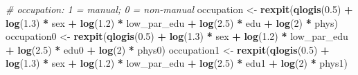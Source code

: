 \documentclass[
]{book}
\newenvironment{Shaded}{\begin{snugshade}}{\end{snugshade}}
\newcommand{\CommentTok}[1]{\textcolor[rgb]{0.56,0.35,0.01}{\textit{#1}}}
\newcommand{\DecValTok}[1]{\textcolor[rgb]{0.00,0.00,0.81}{#1}}
\newcommand{\FloatTok}[1]{\textcolor[rgb]{0.00,0.00,0.81}{#1}}
\newcommand{\FunctionTok}[1]{\textcolor[rgb]{0.13,0.29,0.53}{\textbf{#1}}}
\newcommand{\NormalTok}[1]{#1}
\newcommand{\OtherTok}[1]{\textcolor[rgb]{0.56,0.35,0.01}{#1}}
\newcommand{\SpecialCharTok}[1]{\textcolor[rgb]{0.81,0.36,0.00}{\textbf{#1}}}
\begin{document}
\begin{Shaded}
\begin{Highlighting}[]
  \CommentTok{\# occupation: 1 = manual; 0 = non{-}manual}
\NormalTok{  occupation }\OtherTok{\textless{}{-}} \FunctionTok{rexpit}\NormalTok{(}\FunctionTok{qlogis}\NormalTok{(}\FloatTok{0.5}\NormalTok{) }\SpecialCharTok{+} \FunctionTok{log}\NormalTok{(}\FloatTok{1.3}\NormalTok{) }\SpecialCharTok{*}\NormalTok{ sex  }\SpecialCharTok{+} \FunctionTok{log}\NormalTok{(}\FloatTok{1.2}\NormalTok{) }\SpecialCharTok{*}\NormalTok{ low\_par\_edu }\SpecialCharTok{+} 
                   \FunctionTok{log}\NormalTok{(}\FloatTok{2.5}\NormalTok{) }\SpecialCharTok{*}\NormalTok{ edu }\SpecialCharTok{+} \FunctionTok{log}\NormalTok{(}\DecValTok{2}\NormalTok{) }\SpecialCharTok{*}\NormalTok{ phys) }
\NormalTok{  occupation0 }\OtherTok{\textless{}{-}} \FunctionTok{rexpit}\NormalTok{(}\FunctionTok{qlogis}\NormalTok{(}\FloatTok{0.5}\NormalTok{) }\SpecialCharTok{+} \FunctionTok{log}\NormalTok{(}\FloatTok{1.3}\NormalTok{) }\SpecialCharTok{*}\NormalTok{ sex  }\SpecialCharTok{+} \FunctionTok{log}\NormalTok{(}\FloatTok{1.2}\NormalTok{) }\SpecialCharTok{*}\NormalTok{ low\_par\_edu }\SpecialCharTok{+} 
                          \FunctionTok{log}\NormalTok{(}\FloatTok{2.5}\NormalTok{) }\SpecialCharTok{*}\NormalTok{ edu0 }\SpecialCharTok{+} \FunctionTok{log}\NormalTok{(}\DecValTok{2}\NormalTok{) }\SpecialCharTok{*}\NormalTok{ phys0)  }
\NormalTok{  occupation1 }\OtherTok{\textless{}{-}} \FunctionTok{rexpit}\NormalTok{(}\FunctionTok{qlogis}\NormalTok{(}\FloatTok{0.5}\NormalTok{) }\SpecialCharTok{+} \FunctionTok{log}\NormalTok{(}\FloatTok{1.3}\NormalTok{) }\SpecialCharTok{*}\NormalTok{ sex  }\SpecialCharTok{+} \FunctionTok{log}\NormalTok{(}\FloatTok{1.2}\NormalTok{) }\SpecialCharTok{*}\NormalTok{ low\_par\_edu }\SpecialCharTok{+} 
                          \FunctionTok{log}\NormalTok{(}\FloatTok{2.5}\NormalTok{) }\SpecialCharTok{*}\NormalTok{ edu1 }\SpecialCharTok{+} \FunctionTok{log}\NormalTok{(}\DecValTok{2}\NormalTok{) }\SpecialCharTok{*}\NormalTok{ phys1) }
  

\end{Highlighting}
\end{Shaded}
\end{document}
